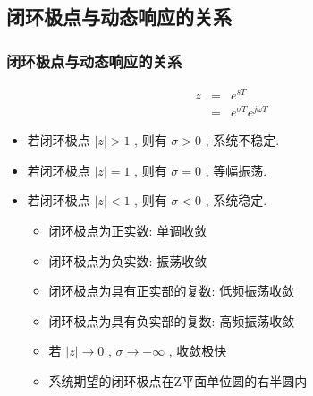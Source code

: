 \documentclass[table]{article}
\begin{document}
\subsection{闭环极点与动态响应的关系}
\label{sec-7-3}
\begin{frame}
\frametitle{闭环极点与动态响应的关系}
\label{sec-7-3-1}

\begin{eqnarray*}
z & = & e^{sT}\\
 &=& e^{\sigma T}e^{j\omega T}
\end{eqnarray*}

\begin{itemize}
\item 若闭环极点  $|z|>1$  , 则有  $\sigma>0$  , 系统不稳定.
\item 若闭环极点  $|z|=1$  , 则有  $\sigma=0$  , 等幅振荡.
\item 若闭环极点  $|z|<1$  , 则有  $\sigma<0$  , 系统稳定.
\begin{itemize}
\item <2->闭环极点为正实数: 单调收敛
\item <2->闭环极点为负实数: 振荡收敛
\item <2->闭环极点为具有正实部的复数: 低频振荡收敛
\item <2->闭环极点为具有负实部的复数: 高频振荡收敛
\item <2->若  $|z|\rightarrow 0$  ,  $\sigma\rightarrow -\infty$ , 收敛极快
\item <3->系统期望的闭环极点在Z平面单位圆的右半圆内
\end{itemize}
\end{itemize}
\end{frame}
\end{document}
